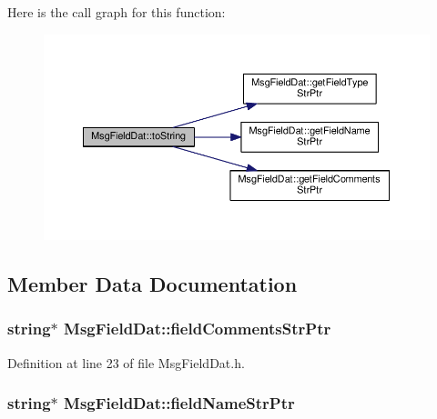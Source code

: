 Here is the call graph for this function\-:
\nopagebreak
\begin{figure}[H]
\begin{center}
\leavevmode
\includegraphics[width=350pt]{class_msg_field_dat_a722d2357267860a38ca226502eb0c61e_cgraph}
\end{center}
\end{figure}




\subsection{Member Data Documentation}
\hypertarget{class_msg_field_dat_a419eff9499b3441425fc0a8e04a12c81}{
\subsubsection[{field\-Comments\-Str\-Ptr}]{\setlength{\rightskip}{0pt plus 5cm}string$\ast$ Msg\-Field\-Dat\-::field\-Comments\-Str\-Ptr\hspace{0.3cm}{\ttfamily [private]}}}\label{class_msg_field_dat_a419eff9499b3441425fc0a8e04a12c81}


Definition at line 23 of file Msg\-Field\-Dat.\-h.

\hypertarget{class_msg_field_dat_a55d98818f189cf1a3e00089b0fcf2128}{
\subsubsection[{field\-Name\-Str\-Ptr}]{\setlength{\rightskip}{0pt plus 5cm}string$\ast$ Msg\-Field\-Dat\-::field\-Name\-Str\-Ptr\hspace{0.3cm}{\ttfamily [private]}}}\label{class_msg_field_dat_a55d98818f189cf1a3e00089b0fcf2128}


